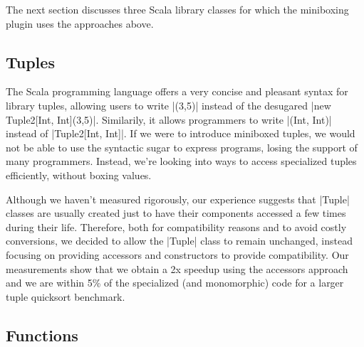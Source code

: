 The next section discusses three Scala library classes for which the miniboxing plugin uses the approaches above.

\subsection{Tuples}

The Scala programming language offers a very concise and pleasant syntax for library tuples, allowing users to write |(3,5)| instead of the desugared |new Tuple2[Int, Int](3,5)|. Similarily, it allows programmers to write |(Int, Int)| instead of |Tuple2[Int, Int]|. If we were to introduce miniboxed tuples, we would not be able to use the syntactic sugar to express programs, losing the support of many programmers. Instead, we're looking into ways to access specialized tuples efficiently, without boxing values.

Although we haven't measured rigorously, our experience suggests that |Tuple| classes are usually created just to have their components accessed a few times during their life. Therefore, both for compatibility reasons and to avoid costly conversions, we decided to allow the |Tuple| class to remain unchanged, instead focusing on providing accessors and constructors to provide compatibility.
Our measurements show that we obtain a 2x speedup using the accessors approach and we are within 5\% of the specialized (and monomorphic) code for a larger tuple quicksort benchmark.

\subsection{Functions}





